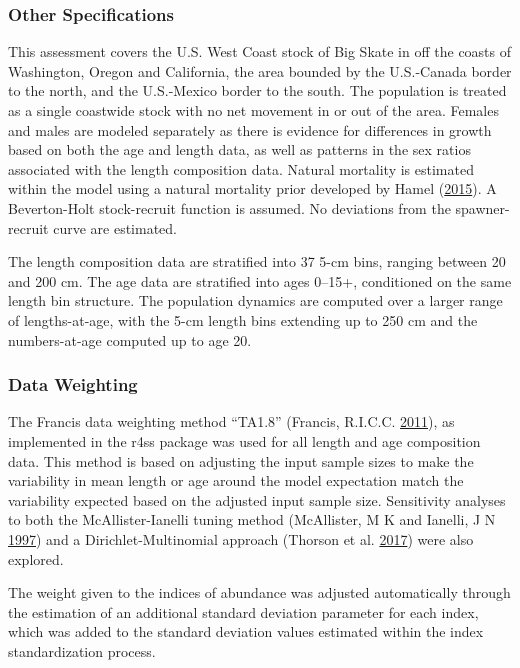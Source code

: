 \documentclass[12pt,]{article}
\begin{document}
\hypertarget{other-specifications}{%
\subsubsection{Other Specifications}\label{other-specifications}}

This assessment covers the U.S. West Coast stock of Big Skate in off the
coasts of Washington, Oregon and California, the area bounded by the
U.S.-Canada border to the north, and the U.S.-Mexico border to the
south. The population is treated as a single coastwide stock with no net
movement in or out of the area. Females and males are modeled separately
as there is evidence for differences in growth based on both the age and
length data, as well as patterns in the sex ratios associated with the
length composition data. Natural mortality is estimated within the model
using a natural mortality prior developed by Hamel
(\protect\hyperlink{ref-Hamel2015}{2015}). A Beverton-Holt stock-recruit
function is assumed. No deviations from the spawner-recruit curve are
estimated.

The length composition data are stratified into 37 5-cm bins, ranging
between 20 and 200 cm. The age data are stratified into ages 0--15+,
conditioned on the same length bin structure. The population dynamics
are computed over a larger range of lengths-at-age, with the 5-cm length
bins extending up to 250 cm and the numbers-at-age computed up to age
20.

\hypertarget{data-weighting}{%
\subsubsection{Data Weighting}\label{data-weighting}}

The Francis data weighting method ``TA1.8'' (Francis, R.I.C.C.
\protect\hyperlink{ref-Francis2011}{2011}), as implemented in the r4ss
package was used for all length and age composition data. This method is
based on adjusting the input sample sizes to make the variability in
mean length or age around the model expectation match the variability
expected based on the adjusted input sample size. Sensitivity analyses
to both the McAllister-Ianelli tuning method (McAllister, M K and
Ianelli, J N \protect\hyperlink{ref-McAllister1997}{1997}) and a
Dirichlet-Multinomial approach (Thorson et al.
\protect\hyperlink{ref-Thorson2017c}{2017}) were also explored.

The weight given to the indices of abundance was adjusted automatically
through the estimation of an additional standard deviation parameter for
each index, which was added to the standard deviation values estimated
within the index standardization process.
\end{document}
